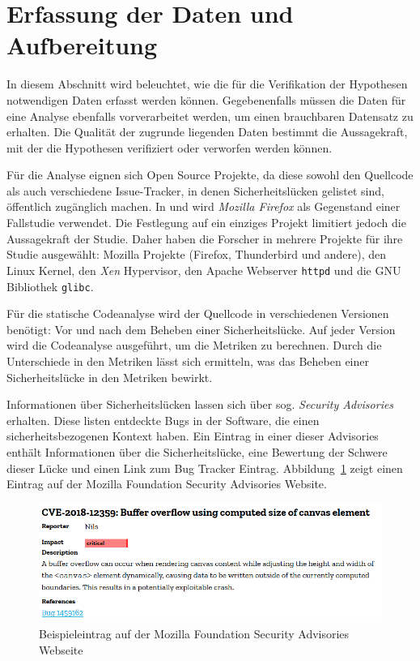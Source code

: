\section{Erfassung der Daten und Aufbereitung}
\label{sec:erfassung}
In diesem Abschnitt wird beleuchtet, wie die für die Verifikation der Hypothesen notwendigen Daten erfasst werden können.
Gegebenenfalls müssen die Daten für eine Analyse ebenfalls vorverarbeitet werden, um einen brauchbaren Datensatz zu erhalten.
Die Qualität der zugrunde liegenden Daten bestimmt die Aussagekraft, mit der die Hypothesen verifiziert oder verworfen werden können.

Für die Analyse eignen sich Open Source Projekte,
da diese sowohl den Quellcode als auch verschiedene Issue-Tracker,
in denen Sicherheitslücken gelistet sind,
öffentlich zugänglich machen.
In \cite{chowdhury_zulkernine_2010} und \cite{chowdhury_zulkernine_2009} wird \emph{Mozilla Firefox} als Gegenstand einer Fallstudie verwendet.
Die Festlegung auf ein einziges Projekt limitiert jedoch die Aussagekraft der Studie.
Daher haben die Forscher in \cite{alves_et_al} mehrere Projekte für ihre Studie ausgewählt: 
Mozilla Projekte (Firefox, Thunderbird und andere),
den Linux Kernel,
den \emph{Xen} Hypervisor,
den Apache Webserver \texttt{httpd} und
die GNU Bibliothek \texttt{glibc}.

Für die statische Codeanalyse wird der Quellcode in verschiedenen Versionen benötigt: Vor und nach dem Beheben einer Sicherheitslücke.
Auf jeder Version wird die Codeanalyse ausgeführt, um die Metriken zu berechnen.
Durch die Unterschiede in den Metriken lässt sich ermitteln, was das Beheben einer Sicherheitslücke in den Metriken bewirkt.

Informationen über Sicherheitslücken lassen sich über sog. \emph{Security Advisories} erhalten.
Diese listen entdeckte Bugs in der Software, die einen sicherheitsbezogenen Kontext haben.
Ein Eintrag in einer dieser Advisories enthält Informationen über die Sicherheitslücke, eine Bewertung der Schwere dieser Lücke und einen Link zum Bug Tracker Eintrag.
Abbildung~\ref{fig:mfsa} zeigt einen Eintrag auf der Mozilla Foundation Security Advisories Website.
\begin{figure}
	\includegraphics[width=\textwidth]{img/mfsa_example.png}
	\caption{Beispieleintrag auf der Mozilla Foundation Security Advisories Webseite}
	\label{fig:mfsa}
\end{figure}

